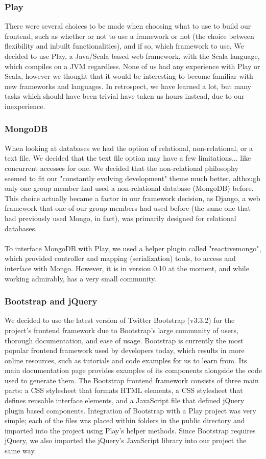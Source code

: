 \documentclass{article}
\begin{document}
\subsubsection{Play}
There were several choices to be made when choosing what to use to build our frontend, such as whether or not to use a framework or not (the choice between flexibility and inbuilt functionalities), and if so, which framework to use. We decided to use Play, a Java/Scala based web framework, with the Scala language, which compiles on a JVM regardless. None of us had any experience with Play or Scala, however we thought that it would be interesting to become familiar with new frameworks and languages. In retrospect, we have learned a lot, but many tasks which should have been trivial have taken us hours instead, due to our inexperience.

\subsubsection{MongoDB}
When looking at databases we had the option of relational, non-relational, or a text file. We decided that the text file option may have a few limitations... like concurrent accesses for one. We decided that the non-relational philosophy seemed to fit our "constantly evolving development" theme much better, although only one group member had used a non-relational database (MongoDB) before. This choice actually became a factor in our framework decision, as Django, a web framework that one of our group members had used before (the same one that had previously used Mongo, in fact), was primarily designed for relational databases.
\\\\
To interface MongoDB with Play, we used a helper plugin called "reactivemongo", which provided controller and mapping (serialization) tools, to access and interface with Mongo. However, it is in version 0.10 at the moment, and while working admirably, has a very small community.

\subsubsection{Bootstrap and jQuery}

We decided to use the latest version of Twitter Bootstrap (v3.3.2) for the project's frontend framework due to Bootstrap's large community of users, thorough documentation, and ease of usage. Bootstrap is currently the most popular frontend framework used by developers today, which results in more online resources, such as tutorials and code examples for us to learn from. Its main documentation page provides examples of its components alongside the code used to generate them. The Bootstrap frontend framework consists of three main parts: a CSS stylesheet that formats HTML elements, a CSS stylesheet that defines reusable interface elements, and a JavaScript file that defined jQuery plugin based components. Integration of Bootstrap with a Play project was very simple; each of the files was placed within folders in the public directory and imported into the project using Play's helper methods. Since Bootstrap requires jQuery, we also imported the jQuery's JavaScript library into our project the same way.
\end{document}
